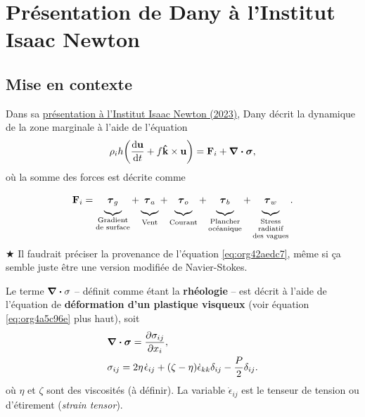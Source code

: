 \documentclass[10pt]{article}
\numberwithin{equation}{section}
\newcommand{\kvf}{\vb{\hat{k}}}
\newcommand{\uu}{\vb{u}}
\newcommand{\short}{\vphantom{pA}}
\newcommand{\tall}{\vphantom{pA^{x^x}_p}}
\newcommand{\grande}{\vphantom{\frac{1}{xx}}}
\newcommand{\pt}{\hspace{1pt}} %
\begin{document}
\section{Présentation de Dany à l'Institut Isaac Newton}
\label{sec:orgbedf537}

\subsection{Mise en contexte}
\label{sec:org2d4f2a7}

Dans sa \href{https://www.youtube.com/watch?v=\_V7ozTp6SJM}{présentation à l'Institut Isaac Newton (2023)}, Dany décrit la dynamique de la zone marginale à l'aide de l'équation
\begin{equation}
\label{eq:org42aedc7}
   \rho_i h \qty(\dv{\uu}{t} + f \kvf\times\uu) = \vb{F}_i + \divergence{\boldsymbol{\sigma}},
\end{equation}
où la somme des forces est décrite comme
\begin{equation}
\label{eq:org4350ea9}
   \vb{F}_i =
    \underbrace{\grande\boldsymbol{\tau}_g}_{\substack{\text{Gradient}\short\\\text{de surface}}}
   +\underbrace{\grande\boldsymbol{\tau}_a}_{\tall\text{Vent}}
   +\underbrace{\grande\boldsymbol{\tau}_o}_{\tall\text{Courant}}
   +\underbrace{\grande\boldsymbol{\tau}_b}_{\substack{\text{Plancher}\vphantom{A^2p}\\\text{océanique}}}
   +\underbrace{\grande\boldsymbol{\tau}_w}_{\substack{\text{Stress}\short\vphantom{A^1}\\\text{radiatif}\short\\\text{des vagues}}} .
\end{equation}
\(\bigstar\) Il faudrait préciser la provenance de l'équation \ref{eq:org42aedc7}, même si ça semble juste être une version modifiée de Navier-Stokes.\bigskip

Le terme \(\divergence{\sigma}\) -- définit comme étant la \textbf{rhéologie} -- est décrit à l'aide de l'équation de \textbf{déformation d'un plastique visqueux} \autocite{hunke1997elastic} (voir équation \ref{eq:org4a5c96e} plus haut), soit
\begin{align}
   & \divergence{\boldsymbol{\sigma}} = \pdv{\sigma_{ij}}{x_i},\\
   & \sigma_{ij} = 2\eta \pt\dot{\epsilon}_{ij} + \qty(\zeta - \eta) \dot{\epsilon}_{kk} \delta_{ij} - \frac{P}{2} \delta_{ij}.
\end{align}
où \(\eta\) et \(\zeta\) sont des viscosités (à définir).
La variable \(\dot{\epsilon}_{ij}\) est le tenseur de tension ou d'étirement (\emph{strain tensor}).\bigskip
\end{document}
